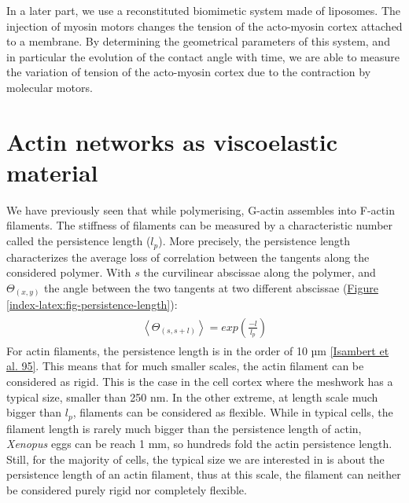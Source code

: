 \documentclass[A4paperpaper,11pt,english]{sphinxmanual}
\begin{document}
In a later part, we use a reconstituted biomimetic system made of liposomes. The
injection of myosin motors changes the tension of the acto-myosin cortex
attached to a membrane. By determining the geometrical parameters of this
system, and in particular the evolution of the contact angle with time, we are
able to measure the variation of tension of the acto-myosin cortex due to the contraction by
molecular motors.


\section{Actin networks as viscoelastic material}
\label{index-latex:viscoelastic}\label{index-latex:actin-networks-as-viscoelastic-material}
We have previously seen that while polymerising, G-actin assembles into F-actin
filaments. The stiffness of filaments can be measured by a characteristic number
called the persistence length (\(l_p\)). More precisely, the
persistence length characterizes the average loss of correlation between the
tangents along the considered polymer. With \(s\) the curvilinear abscissae along the polymer,
and \(\Theta_{(x,y)}\) the angle between the two tangents at two different abscissae (\hyperref[index-latex:fig-persistence-length]{Figure  \ref*{index-latex:fig-persistence-length}}):
\label{index-latex:equation-eqa6}\begin{gather}
\begin{split}\left<\Theta_{(s,s+l)}\right> = exp\left(\frac{-l}{l_p}\right)\end{split}\label{index-latex-eqa6}
\end{gather}
For actin filaments, the
persistence length is in the order of 10 µm {\hyperref[index-latex:isambert1995]{{[}Isambert et al. 95{]}}}. This means
that for much smaller scales, the actin filament can be considered as rigid.
This is the case in the cell cortex where the meshwork has a typical size, smaller than 250 nm. In
the other extreme, at length scale much bigger than \(l_p\), filaments can
be considered as flexible. While in typical cells, the filament length is
rarely much bigger than the persistence length of actin, \emph{Xenopus} eggs can be
reach 1 mm, so hundreds fold the actin persistence length.
Still, for the majority of cells, the typical size we are interested in
is about the persistence length of an actin filament, thus at this scale, the filament can neither be considered purely
rigid nor completely flexible.
\end{document}
